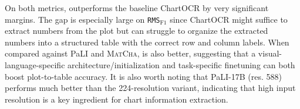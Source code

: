 \begin{table}[ht]
    \centering
    \caption{Benchmarking plot-to-table conversion accuracy on the PlotQA dataset (all individual plots in PlotQA test sets). Both a pipeline-bsed based method (ChartOCR) and end-to-end methods (PaLI-17B and \textsc{MatCha}) are used as baselines. \texttt{RMS}$_{\text{F1}}$ can capture the shortcomings of baselines such as ChartOCR with much greater sensitivity.}
    \label{tab:plot_to_table}
\end{table}

On both metrics, \model{} outperforms the baseline ChartOCR by very significant margins. The gap is especially large on \texttt{RMS}$_{\text{F1}}$ since ChartOCR might suffice to extract numbers from the plot but can struggle to organize the extracted numbers into a structured table with the correct row and column labels. When compared against PaLI and \textsc{MatCha}, \model{} is also better, suggesting that a visual-language-specific architecture/initialization and task-specific finetuning can both boost plot-to-table accuracy. It is also worth noting that PaLI-17B (res. 588) performs much better than the 224-resolution variant, indicating that high input resolution is a key ingredient for chart information extraction.

